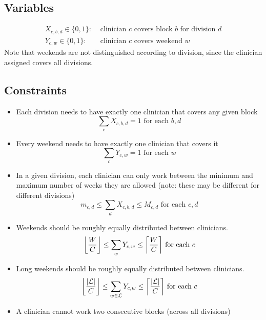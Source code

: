 \documentclass[]{article}
\newcommand{\mc}{\mathcal}
\DeclarePairedDelimiter{\floor}{\lfloor}{\rfloor}
\DeclarePairedDelimiter{\ceil}{\lceil}{\rceil}
\begin{document}
\subsection{Variables}
	\begin{align}
		X_{c, b, d} \in \{0, 1\}: &\text{ clinician $c$ covers block $b$ for division $d$} \\
		Y_{c, w} \in \{0, 1\}: &\text{ clinician $c$ covers weekend $w$}
	\end{align}
Note that weekends are not distinguished according to division, since the clinician assigned covers all divisions.

\subsection{Constraints} \label{constraints}
	\begin{itemize}
		\item Each division needs to have exactly one clinician that covers any given block
			\begin{equation}
				\sum_{c} X_{c, b, d} = 1 \text{ for each } b, d
			\end{equation}
		\item Every weekend needs to have exactly one clinician that covers it
			\begin{equation}
				\sum_{c} Y_{c, w} = 1 \text{ for each } w
			\end{equation}
		\item In a given division, each clinician can only work between the minimum and maximum number of weeks they are allowed (note: these may be different for different divisions)
			\begin{equation}
				m_{c, d} \leq \sum_{d} X_{c, b, d} \leq M_{c, d} \text{ for each } c, d
			\end{equation}
		\item Weekends should be roughly equally distributed between clinicians.
			\begin{equation}
				\floor*{ \frac{W}{C} } \leq \sum_{w} Y_{c, w} \leq \ceil*{ \frac{W}{C} } \text{ for each } c
			\end{equation}
		\item Long weekends should be roughly equally distributed between clinicians.
			\begin{equation}
				\floor*{\frac{|\mc{L}|}{C}} \leq \sum_{w \in \mc{L}} Y_{c, w} \leq \ceil*{\frac{|\mc{L}|}{C}} \text{ for each } c
			\end{equation}
		\item A clinician cannot work two consecutive blocks (across all divisions)

\end{itemize}
\end{document}
